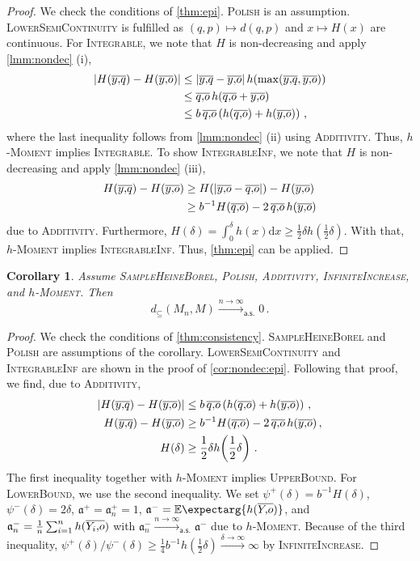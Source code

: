 \documentclass{scrartcl}
\renewcommand{\subset}{\subseteq}
\newcommand{\Ex}{\E\expectarg}
\newcommand*{\ms}[1]{\mathsf{#1}}
\newcommand*{\mf}[1]{\mathfrak{#1}}
\newcommand{\dl}{\mathrm{d}}
\newcommand{\equationFullstop}{\, .}
\newcommand{\eqfs}{\equationFullstop}
\newcommand{\equationComma}{\, ,}
\newcommand{\eqcm}{\equationComma}
\theoremstyle{plain}\newtheorem{theorem}{Theorem}[section]
\newtheorem{corollary}[theorem]{Corollary}
\theoremstyle{definition}
\theoremstyle{remark}
\begin{document}
\begin{proof}
	We check the conditions of \autoref{thm:epi}. \textsc{Polish} is an assumption. 
	\textsc{LowerSemiContinuity} is fulfilled as $(q,p)\mapsto d(q,p)$ and $x \mapsto H(x)$ are continuous.
	For \textsc{Integrable}, we note that $H$ is non-decreasing and apply \autoref{lmm:nondec} (i),
	\begin{align*}
		\abs{H(\ol yq) - H(\ol yo)} 
		&\leq 
		\abs{\ol yq - \ol yo} h\brOf{\max(\ol yq, \ol yo)}
		\\&\leq 
		\ol qo\, h(\ol qo + \ol yo)
		\\&\leq 
		b\, \ol qo \br{h(\ol qo) + h(\ol yo)}
		\eqcm
	\end{align*}
	where the last inequality follows from \autoref{lmm:nondec} (ii) using \textsc{Additivity}.
	Thus, \textsc{$h$-Moment} implies \textsc{Integrable}.
	To show \textsc{IntegrableInf}, we note that $H$ is non-decreasing and apply \autoref{lmm:nondec} (iii),
	\begin{align*}
		H(\ol yq) - H(\ol yo)
		&\geq 
		H(\abs{\ol yo - \ol qo}) - H(\ol yo)
		\\&\geq 
		b^{-1} H( \ol qo) - 2  \,\ol qo\, h( \ol yo)
	\end{align*}
	due to \textsc{Additivity}. Furthermore, $H(\delta)  = \int_0^\delta h(x) \dl x \geq \frac12 \delta h(\frac12 \delta)$.
	With that, \textsc{$h$-Moment} implies \textsc{IntegrableInf}. 
	Thus, \autoref{thm:epi} can be applied.
\end{proof}
\begin{corollary}\label{cor:nondec:onehaus}
	Assume \textsc{SampleHeineBorel}, \textsc{Polish}, \textsc{Additivity}, \textsc{InfiniteIncrease}, and \textsc{$h$-Moment}.
	Then
	\begin{equation*}
		d_\subset(M_n, M) \xrightarrow{n\to\infty}_{\ms{a.s.}} 0
		\eqfs
	\end{equation*}
\end{corollary}
\begin{proof}
	We check the conditions of \autoref{thm:consistency}. \textsc{SampleHeineBorel} and \textsc{Polish} are assumptions of the corollary. \textsc{LowerSemiContinuity} and \textsc{IntegrableInf} are shown in the proof of \autoref{cor:nondec:epi}.
	Following that proof, we find, due to \textsc{Additivity},
	\begin{align*}
		\abs{H(\ol yq) - H(\ol yo)} &\leq b\, \ol qo \br{h(\ol qo) + h(\ol yo)}\eqcm
		\\
		H(\ol yq) - H(\ol yo) &\geq 	b^{-1} H( \ol qo) - 2 \,\ol qo\, h( \ol yo)\eqcm\\
		H(\delta)  &\geq \frac12 \delta h\brOf{\frac12 \delta}
		\eqfs
	\end{align*}
	The first inequality together with \textsc{$h$-Moment} implies \textsc{UpperBound}.
	For \textsc{LowerBound}, we use the second inequality. We set $\psi^+(\delta) = 	b^{-1} H(\delta)$, $\psi^-(\delta) = 2 \delta$, $\mf a^+=\mf a_n^+ = 1$, $\mf a^{-} = \Ex{h(\ol Yo)}$, and $\mf a^-_n = \frac1n \sum_{i=1}^n h(\ol {Y_i}o)$ with $\mf a^-_n\xrightarrow{n\to\infty}_{\ms{a.s.}}\mf a^-$ due to \textsc{$h$-Moment}. Because of the third inequality, $\psi^+(\delta)/\psi^-(\delta) \geq \frac14 b^{-1} h(\frac12 \delta) \xrightarrow{\delta\to\infty} \infty$ by \textsc{InfiniteIncrease}.
\end{proof}
\end{document}
